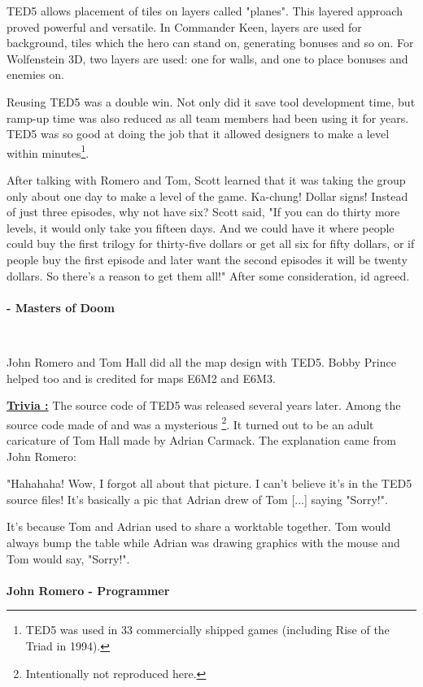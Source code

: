 \documentclass[book.tex]{subfiles}
\begin{document}
 \par
 TED5 allows placement of tiles on layers called "planes". This layered approach proved powerful and versatile. In Commander Keen, layers are used for background, tiles which the hero can stand on, generating bonuses and so on. For Wolfenstein 3D, two layers are used: one for walls, and one to place bonuses and enemies on.\\
 \par

Reusing TED5 was a double win. Not only did it save tool development time, but ramp-up time was also reduced as all team members had been using it for years. TED5 was so good at doing the job that it allowed designers to make a level within minutes\footnote{TED5 was used in 33 commercially shipped games (including Rise of the Triad in 1994).}.\\
\par

 \begin{fancyquotes}
After talking with Romero and Tom, Scott learned that it was taking the group only about one day to make a level of the game. Ka-chung! Dollar signs! Instead of just three episodes, why not have six? Scott said, "If you can do thirty more levels, it would only take you fifteen days. And we could have it where people could buy the first trilogy for thirty-five dollars or get all six for fifty dollars, or if people buy the first episode and later want the second episodes it will be twenty dollars. So there's a reason to get them all!" After some consideration, id agreed.\\
\\
 \textbf{- Masters of Doom}
 \end{fancyquotes}\\

\par
John Romero and Tom Hall did all the map design with TED5. Bobby Prince helped too and is credited for maps E6M2 and E6M3.\\
\par
 \textbf{\underline{Trivia :}} The source code of TED5 was released several years later. Among the source code made of  and  was a mysterious \footnote{Intentionally not reproduced here.}. It turned out to be an adult caricature of Tom Hall made by Adrian Carmack. The explanation came from John Romero:\\%
\par
 \begin{fancyquotes}
   "Hahahaha! Wow, I forgot all about that picture. I can't believe it's 
in the TED5 source files! It's basically a pic that Adrian drew of Tom 
[...] saying "Sorry!".\\
\par 
It's because Tom and Adrian used to share a worktable together. Tom 
would always bump the table while Adrian was drawing graphics with the 
mouse and Tom would say, "Sorry!".\\
   \\
\textbf{John Romero - Programmer}
 \end{fancyquotes}
\end{document}
